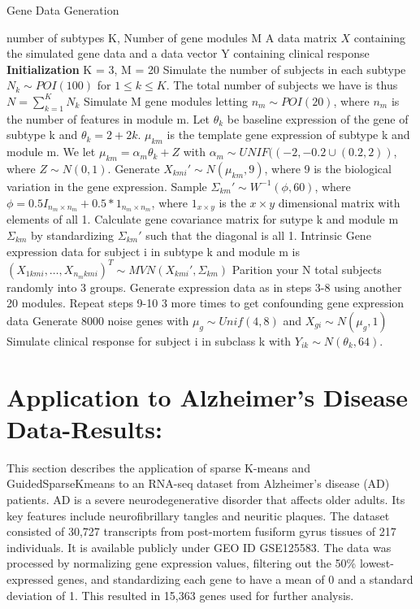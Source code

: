 \documentclass{statsoc}
\begin{document}
\begin{algorithm}
    \caption{Gene Data Generation}
    \begin{algorithmic}[1]
        \INPUT number of subtypes K, Number of gene modules M
        \OUTPUT A data matrix $X$ containing the simulated gene data and a data vector Y containing clinical response
        \STATE \textbf{Initialization} K = 3, M = 20
        \STATE Simulate the number of subjects in each subtype $N_k \sim POI(100)$ for $1 \leq k \leq K$. The total number of subjects we have is thus $N = \sum_{k=1}^K N_k$
        \STATE Simulate M gene modules letting $n_m \sim POI(20)$, where $n_m$ is the number of features in module m.
        \STATE Let $\theta_k$ be baseline expression of the gene of subtype k and $\theta_k = 2 + 2k$. $\mu_{km}$ is the template gene expression of subtype k and module m. We let $\mu_{km} = \alpha_m\theta_k + Z$ with $\alpha_m \sim UNIF((-2,-0.2 \cup (0.2,2))$, where $Z \sim N(0,1)$.
        \STATE Generate $X_{kmi}' \sim N(\mu_{km}, 9)$, where 9 is the biological variation in the gene expression. 
        \STATE Sample $\Sigma_{km}' \sim W^{-1}(\phi, 60)$, where $\phi = 0.5 I_{n_m \times n_m} + 0.5*1_{n_m\times n_m}$, where $1_{x\times y}$ is the $x\times y$ dimensional matrix with elements of all 1.
        \STATE Calculate gene covariance matrix for sutype k and module m $\Sigma_{km}$ by standardizing $\Sigma_{km}'$ such that the diagonal is all 1.
        \STATE Intrinsic Gene expression data for subject i in subtype k and module m is $(X_{1kmi}, \ldots, X_{n_mkmi})^T \sim MVN(X_{kmi}', \Sigma_{km})$
        \STATE Parition your N total subjects randomly into 3 groups.
        \STATE Generate expression data as in steps 3-8 using another 20 modules.
        \STATE Repeat steps 9-10 3 more times to get confounding gene expression data
        \STATE Generate 8000 noise genes with $\mu_g \sim Unif(4,8)$ and $X_{gi} \sim N(\mu_g, 1)$
        \STATE Simulate clinical response for subject i in subclass k with $Y_{ik} \sim N(\theta_k, 64)$.
    \end{algorithmic}
\end{algorithm}

\section{Application to Alzheimer’s Disease Data-Results:}

This section describes the application of sparse K-means and GuidedSparseKmeans to an RNA-seq dataset from Alzheimer’s disease (AD) patients. AD is a severe neurodegenerative disorder that affects older adults. Its key features include neurofibrillary tangles and neuritic plaques. The dataset consisted of 30,727 transcripts from post-mortem fusiform gyrus tissues of 217 individuals. It is available publicly under GEO ID GSE125583. The data was processed by normalizing gene expression values, filtering out the 50\% lowest-expressed genes, and standardizing each gene to have a mean of 0 and a standard deviation of 1. This resulted in 15,363 genes used for further analysis.
\end{document}
